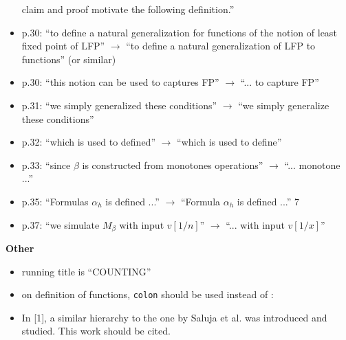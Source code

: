 \begin{itemize}
	claim and proof motivate the following definition.''
	\item p.30: ``to define a natural generalization for functions of the notion of least fixed point of
	LFP'' $\to$ ``to define a natural generalization of LFP to functions'' (or similar)
	\item p.30: ``this notion can be used to captures FP'' $\to$ ``... to capture FP''
	\item p.31: ``we simply generalized these conditions'' $\to$ ``we simply generalize these conditions''
	\item p.32: ``which is used to defined'' $\to$ ``which is used to define''
	\item p.33: ``since $\beta$ is constructed from monotones operations'' $\to$ ``... monotone ...''
	\item p.35: ``Formulas $\alpha_h$ is defined ...'' $\to$ ``Formula $\alpha_h$ is defined ...''
	7
	\item p.37: ``we simulate $M_\beta$ with input $v[1/n]$'' $\to$ ``... with input $v[1/x]$''
\end{itemize}
\vspace{1em}
{\bf Other}
\begin{itemize}
	\setlength\itemsep{0.5em}
	\item running title is ``COUNTING''
	\item on definition of functions, \texttt{colon} should be used instead of :
	\item In [1], a similar hierarchy to the one by Saluja et al. was introduced and studied. This work
	should be cited.
\end{itemize}